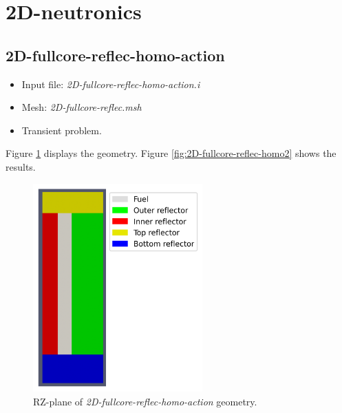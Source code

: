 \documentclass[11pt,letterpaper]{article}
\begin{document}
\section{2D-neutronics}

\subsection{2D-fullcore-reflec-homo-action}

	\begin{itemize}
		\item Input file: \textit{2D-fullcore-reflec-homo-action.i}
		\item Mesh: \textit{2D-fullcore-reflec.msh}
		\item Transient problem.
	\end{itemize}

Figure \ref{fig:2D-fullcore-reflec-homo} displays the geometry.
Figure \ref{fig:2D-fullcore-reflec-homo2} shows the results.

	\begin{figure}[htbp!]
		\centering
		\includegraphics[height=8cm]{2D-fullcore-reflec-homo-mesh}
		\caption{RZ-plane of \textit{2D-fullcore-reflec-homo-action} geometry.}
		\label{fig:2D-fullcore-reflec-homo}
	\end{figure}
\end{document}
